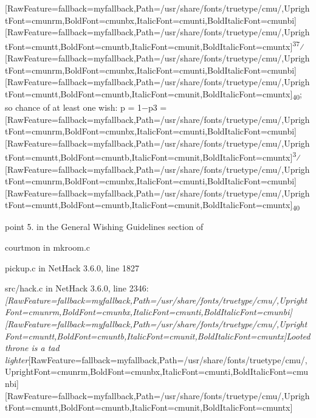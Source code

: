 \begin{myenumerate}
\allowbreak{}\setmainfont{cmunrm.ttf}[RawFeature={fallback=myfallback},Path=/usr/share/fonts/truetype/cmu/,UprightFont=cmunrm,BoldFont=cmunbx,ItalicFont=cmunti,BoldItalicFont=cmunbi]\setmonofont{cmunrm.ttf}[RawFeature={fallback=myfallback},Path=/usr/share/fonts/truetype/cmu/,UprightFont=cmuntt,BoldFont=cmuntb,ItalicFont=cmunit,BoldItalicFont=cmuntx]\textsuperscript{37}⁄\allowbreak{}\setmainfont{cmunrm.ttf}[RawFeature={fallback=myfallback},Path=/usr/share/fonts/truetype/cmu/,UprightFont=cmunrm,BoldFont=cmunbx,ItalicFont=cmunti,BoldItalicFont=cmunbi]\setmonofont{cmunrm.ttf}[RawFeature={fallback=myfallback},Path=/usr/share/fonts/truetype/cmu/,UprightFont=cmuntt,BoldFont=cmuntb,ItalicFont=cmunit,BoldItalicFont=cmuntx]\textsubscript{40}; so chance of at least one wish: p = 1{\mbox{$-$}}p3 = \allowbreak{}\setmainfont{cmunrm.ttf}[RawFeature={fallback=myfallback},Path=/usr/share/fonts/truetype/cmu/,UprightFont=cmunrm,BoldFont=cmunbx,ItalicFont=cmunti,BoldItalicFont=cmunbi]\setmonofont{cmunrm.ttf}[RawFeature={fallback=myfallback},Path=/usr/share/fonts/truetype/cmu/,UprightFont=cmuntt,BoldFont=cmuntb,ItalicFont=cmunit,BoldItalicFont=cmuntx]\textsuperscript{3}⁄\allowbreak{}\setmainfont{cmunrm.ttf}[RawFeature={fallback=myfallback},Path=/usr/share/fonts/truetype/cmu/,UprightFont=cmunrm,BoldFont=cmunbx,ItalicFont=cmunti,BoldItalicFont=cmunbi]\setmonofont{cmunrm.ttf}[RawFeature={fallback=myfallback},Path=/usr/share/fonts/truetype/cmu/,UprightFont=cmuntt,BoldFont=cmuntb,ItalicFont=cmunit,BoldItalicFont=cmuntx]\textsubscript{40}

\item{} point 5. in the General Wishing Guidelines section of \footnotemark[146]

\item{} courtmon\footnotemark[147] in mkroom.c\footnotemark[148]

\item{} pickup.c in NetHack 3.6.0, line 1827\footnotemark[149]
     

\item{} src/hack.c in NetHack 3.6.0, line 2346\footnotemark[150]: {\itshape \allowbreak{}\setmainfont{cmunti.ttf}[RawFeature={fallback=myfallback},Path=/usr/share/fonts/truetype/cmu/,UprightFont=cmunrm,BoldFont=cmunbx,ItalicFont=cmunti,BoldItalicFont=cmunbi]\setmonofont{cmunti.ttf}[RawFeature={fallback=myfallback},Path=/usr/share/fonts/truetype/cmu/,UprightFont=cmuntt,BoldFont=cmuntb,ItalicFont=cmunit,BoldItalicFont=cmuntx]\itshape Looted throne is a tad lighter}\allowbreak{}\setmainfont{cmunrm.ttf}[RawFeature={fallback=myfallback},Path=/usr/share/fonts/truetype/cmu/,UprightFont=cmunrm,BoldFont=cmunbx,ItalicFont=cmunti,BoldItalicFont=cmunbi]\setmonofont{cmunrm.ttf}[RawFeature={fallback=myfallback},Path=/usr/share/fonts/truetype/cmu/,UprightFont=cmuntt,BoldFont=cmuntb,ItalicFont=cmunit,BoldItalicFont=cmuntx]
     



\end{myenumerate}
